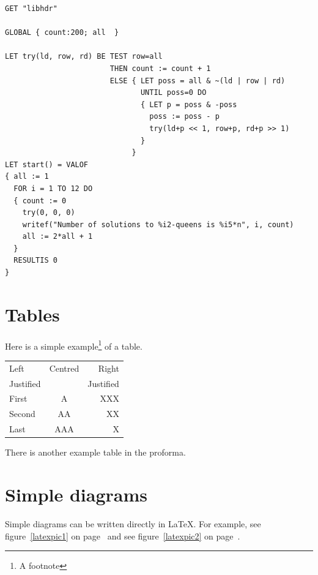 \documentclass[12pt,a4paper,twoside,openright]{report}
\renewcommand{\baselinestretch}{1.1}    %
\begin{document}
{\renewcommand{\baselinestretch}{0.8}\small
\begin{verbatim}
GET "libhdr"
 
GLOBAL { count:200; all  }
 
LET try(ld, row, rd) BE TEST row=all
                        THEN count := count + 1
                        ELSE { LET poss = all & ~(ld | row | rd)
                               UNTIL poss=0 DO
                               { LET p = poss & -poss
                                 poss := poss - p
                                 try(ld+p << 1, row+p, rd+p >> 1)
                               }
                             }
LET start() = VALOF
{ all := 1
  FOR i = 1 TO 12 DO
  { count := 0
    try(0, 0, 0)
    writef("Number of solutions to %i2-queens is %i5*n", i, count)
    all := 2*all + 1
  }
  RESULTIS 0
}
\end{verbatim}
}

\section{Tables}

\begin{samepage}
Here is a simple example\footnote{A footnote} of a table.

\begin{center}
\begin{tabular}{l|c|r}
Left      & Centred & Right \\
Justified &         & Justified \\[3mm]
First     & A       & XXX \\
Second    & AA      & XX  \\
Last      & AAA     & X   \\
\end{tabular}
\end{center}

\noindent
There is another example table in the proforma.
\end{samepage}

\section{Simple diagrams}

Simple diagrams can be written directly in \LaTeX.  For example, see
figure~\ref{latexpic1} on page~\pageref{latexpic1} and see
figure~\ref{latexpic2} on page~\pageref{latexpic2}.
\end{document}
